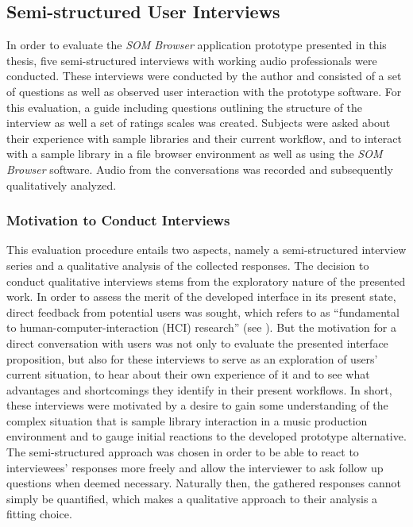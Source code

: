 \subsection{Semi-structured User Interviews}
\label{subsec:evaluation_interviews}
In order to evaluate the \textit{SOM Browser} application prototype presented in
this thesis, five semi-structured interviews with working audio professionals
were conducted. These interviews were conducted by the author and consisted of a
set of questions as well as observed user interaction with the prototype
software. For this evaluation, a guide including questions outlining the
structure of the interview as well a set of ratings scales was created. Subjects
were asked about their experience with sample libraries and their current
workflow, and to interact with a sample library in a file browser environment as
well as using the \textit{SOM Browser} software. Audio from the conversations
was recorded and subsequently qualitatively analyzed.

\subsubsection{Motivation to Conduct Interviews}
\label{subsubsec:interview_motivation}
This evaluation procedure entails two aspects, namely a semi-structured
interview series and a qualitative analysis of the collected responses. The
decision to conduct qualitative interviews stems from the exploratory nature of
the presented work. In order to assess the merit of the developed interface in
its present state, direct feedback from potential users was sought, which
\citet{lazar2017} refers to as ``fundamental to human-computer-interaction (HCI)
research'' (see \citet[p.187]{lazar2017}). But the motivation for a direct
conversation with users was not only to evaluate the presented interface
proposition, but also for these interviews to serve as an exploration of users'
current situation, to hear about their own experience of it and to see what
advantages and shortcomings they identify in their present workflows. In short,
these interviews were motivated by a desire to gain some understanding of the
complex situation that is sample library interaction in a music production
environment and to gauge initial reactions to the developed prototype
alternative. The semi-structured approach was chosen in order to be able to
react to interviewees' responses more freely and allow the interviewer to ask
follow up questions when deemed necessary. Naturally then, the gathered
responses cannot simply be quantified, which makes a qualitative approach to
their analysis a fitting choice.


